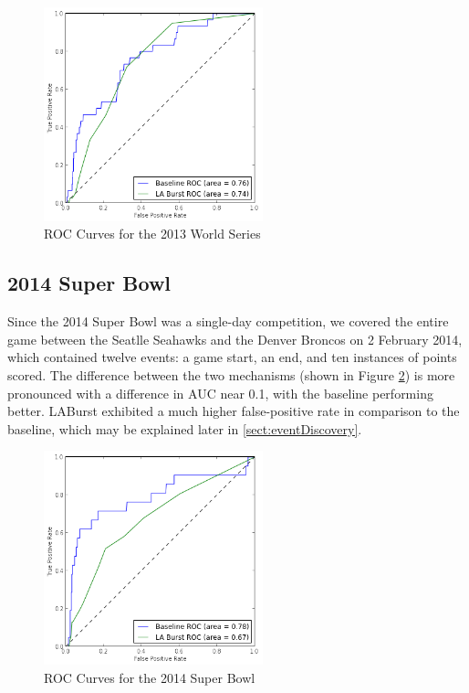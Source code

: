 \documentclass{acm_proc_article-sp}
\begin{document}
\begin{figure}[hbtp]
\begin{center}
\includegraphics[width=2.5in]{./figures/roc_2013_WorldSeries.png}
\caption{ROC Curves for the 2013 World Series}
\label{fig:roc2013WorldSeries}
\end{center}
\end{figure}

\subsection{2014 Super Bowl}

Since the 2014 Super Bowl was a single-day competition, we covered the entire game between the Seatlle Seahawks and the Denver Broncos on 2 February 2014, which contained twelve events: a game start, an end, and ten instances of points scored.
The difference between the two mechanisms (shown in Figure \ref{fig:roc2014SuperBowl}) is more pronounced with a difference in AUC near 0.1, with the baseline performing better.
LABurst exhibited a much higher false-positive rate in comparison to the baseline, which may be explained later in \ref{sect:eventDiscovery}.

\begin{figure}[hbtp]
\begin{center}
\includegraphics[width=2.5in]{./figures/roc_2014_SuperBowl.png}
\caption{ROC Curves for the 2014 Super Bowl}
\label{fig:roc2014SuperBowl}
\end{center}
\end{figure}
\end{document}
